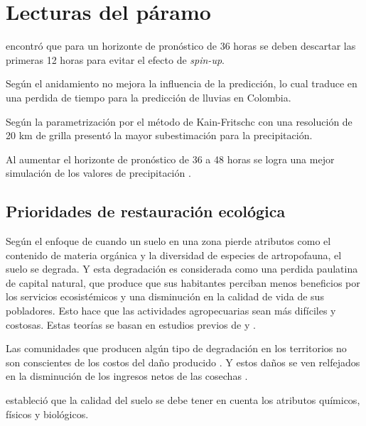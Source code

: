 \documentclass[11pt]{article}
\begin{document}
\section{Lecturas del páramo}

\citet{Uribe2012} encontró que para un horizonte de pronóstico de 36 horas se deben descartar las primeras 12 horas para evitar el efecto de \textit{spin-up}.

Según \citep{Uribe2012} el anidamiento no mejora la influencia de la predicción, lo cual traduce en una perdida de tiempo para la predicción de lluvias en Colombia.

Según \citep{Uribe2012} la parametrización por el método de Kain-Fritschc con una resolución de 20 km de grilla presentó la mayor subestimación para la precipitación.

Al aumentar el horizonte de pronóstico de 36 a 48 horas se logra una mejor simulación de los valores de precipitación \citep{Uribe2012}.



\subsection{Prioridades de restauración ecológica}




Según el enfoque de \citep{Castro-Romero2014} cuando un suelo en una zona pierde atributos como el contenido de materia orgánica y la diversidad de especies de artropofauna, el suelo se degrada. Y esta degradación es considerada como una perdida paulatina de capital natural, que produce que sus habitantes perciban menos beneficios por los servicios ecosistémicos y una disminución en la calidad de vida de sus pobladores. Esto hace que las actividades agropecuarias sean más difíciles y costosas.
Estas teorías se basan en estudios previos de \citet{daily1997nature} y \citet{westman1977much}.

Las comunidades que producen algún tipo de degradación en los territorios no son conscientes de los costos del daño producido \citep{westman1977much}. Y estos daños se ven relfejados en la disminución de los ingresos netos de las cosechas \citep{Castro-Romero2014}.

\citet{Castro-Romero2014} estableció que la calidad del suelo se debe tener en cuenta los atributos químicos, físicos y biológicos.
\end{document}
